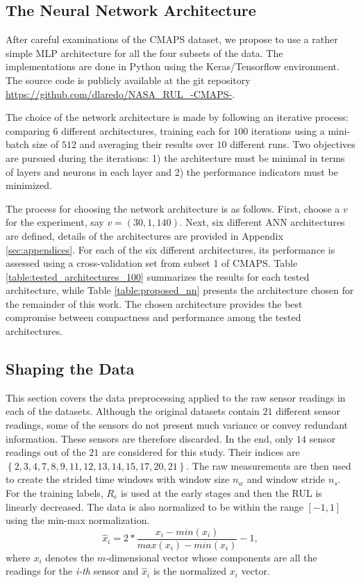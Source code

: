 \documentclass[12pt]{IEEEtran}%
\begin{document}
\subsection{The Neural Network Architecture}

After careful examinations of the CMAPS dataset, we propose to use a rather
simple MLP architecture for all the four subsets of the data. The
implementations are done in Python using the Keras/Tensorflow environment. The
source code is publicly available at the git repository \url{https://github.com/dlaredo/NASA_RUL_-CMAPS-}.

The choice of the network architecture is made by following an iterative
process: comparing 6 different architectures, training each for $100$
iterations using a mini-batch size of $512$ and averaging their results over
$10$ different runs. Two objectives are pursued during the iterations: 1) the
architecture must be minimal in terms of layers and neurons in each layer and
2) the performance indicators must be minimized.

The process for choosing the network architecture is as follows. First, choose
a $v$ for the experiment, say $v= (30, 1, 140)$. Next, six different ANN
architectures are defined, details of the architectures are provided in
Appendix \ref{sec:appendices}. For each of the six different architectures,
its performance is assessed using a cross-validation set from subset 1 of
CMAPS. Table \ref{table:tested_architectures_100} summarizes the results for
each tested architecture, while Table \ref{table:proposed_nn} presents the
architecture chosen for the remainder of this work. The chosen architecture
provides the best compromise between compactness and performance among the
tested architectures.

\subsection{Shaping the Data}

This section covers the data preprocessing applied to the raw sensor readings
in each of the datasets. Although the original datasets contain $21$ different
sensor readings, some of the sensors do not present much variance or convey
redundant information. These sensors are therefore discarded. In the end, only
$14$ sensor readings out of the $21$ are considered for this study. Their
indices are $\left\lbrace 2, 3, 4, 7, 8, 9, 11, 12, 13, 14, 15, 17, 20, 21
\right\rbrace $. The raw measurements are then used to create the strided time
windows with window size $n_{w}$ and window stride $n_{s}$. For the training
labels, $R_{e}$ is used at the early stages and then the RUL is linearly
decreased. The data is also normalized to be within the range $\left[  -1,1
\right]  $ using the min-max normalization.
\begin{equation}
\hat{x}_{i} = 2* \frac{x_{i} - min(x_{i})}{max(x_{i}) - min(x_{i})} - 1,
\label{eq:min_max_norm}%
\end{equation}
where $x_{i}$ denotes the $m$-dimensional vector whose components are all the
readings for the \textit{i-th} sensor and $\hat{x}_{i}$ is the normalized
$x_{i}$ vector.
\end{document}
